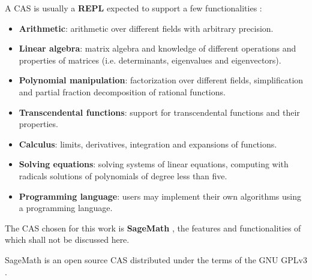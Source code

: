A CAS is usually a \textbf{REPL} expected to support a few functionalities \cite{introcas}:
\begin{itemize}[topsep=0pt, itemsep=0pt, parsep=0pt]
    \item \textbf{Arithmetic}:
        arithmetic over different fields with arbitrary precision.
    \item \textbf{Linear algebra}:
        matrix algebra and knowledge of different operations and properties of matrices
        (i.e. determinants, eigenvalues and eigenvectors).
    \item \textbf{Polynomial manipulation}:
        factorization over different fields, simplification and partial fraction decomposition of rational functions.
    \item \textbf{Transcendental functions}:
        support for transcendental functions and their properties.
    \item \textbf{Calculus}:
        limits, derivatives, integration and expansions of functions.
    \item \textbf{Solving equations}:
        solving systems of linear equations, computing with radicals solutions of polynomials of degree less than five.
    \item \textbf{Programming language}:
        users may implement their own algorithms using a programming language.
\end{itemize}

The CAS chosen for this work is \textbf{SageMath} \cite{sage}, the features and functionalities of which shall not be discussed here.

SageMath is an open source CAS distributed under the terms of the GNU GPLv3 \cite{gpl}.

